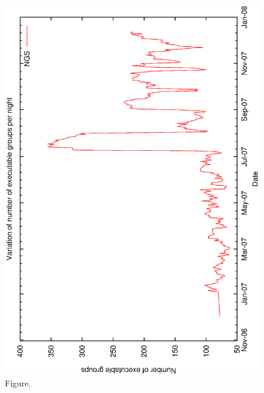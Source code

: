 \documentclass[12pt,a4paper]{article}
\begin{document}
\begin{figure}[htbp]
 \begin{center}
  \includegraphics[scale=1.0, angle=0]{figures/cl_ngs.eps}
 \end{center}
  \caption[Figure.]
{Figure.}
\end{figure}
\clearpage
\end{document}
